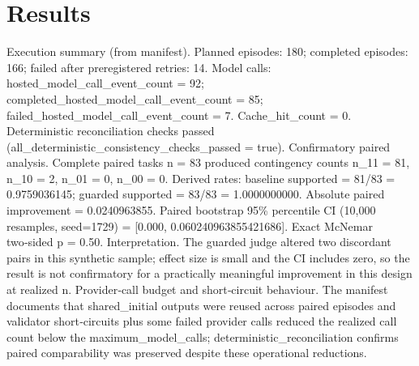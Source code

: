 \documentclass[conference]{IEEEtran}
\begin{document}
\section{Results}
Execution summary (from manifest). Planned episodes: 180; completed episodes: 166; failed after preregistered retries: 14. Model calls: hosted\_model\_call\_event\_count = 92; completed\_hosted\_model\_call\_event\_count = 85; failed\_hosted\_model\_call\_event\_count = 7. Cache\_hit\_count = 0. Deterministic reconciliation checks passed (all\_deterministic\_consistency\_checks\_passed = true). Confirmatory paired analysis. Complete paired tasks n = 83 produced contingency counts n\_11 = 81, n\_10 = 2, n\_01 = 0, n\_00 = 0. Derived rates: baseline supported = 81/83 = 0.9759036145; guarded supported = 83/83 = 1.0000000000. Absolute paired improvement = 0.0240963855. Paired bootstrap 95\% percentile CI (10,000 resamples, seed=1729) = [0.000, 0.060240963855421686]. Exact McNemar two‑sided p = 0.50. Interpretation. The guarded judge altered two discordant pairs in this synthetic sample; effect size is small and the CI includes zero, so the result is not confirmatory for a practically meaningful improvement in this design at realized n. Provider‑call budget and short‑circuit behaviour. The manifest documents that shared\_initial outputs were reused across paired episodes and validator short‑circuits plus some failed provider calls reduced the realized call count below the maximum\_model\_calls; deterministic\_reconciliation confirms paired comparability was preserved despite these operational reductions.
\end{document}
